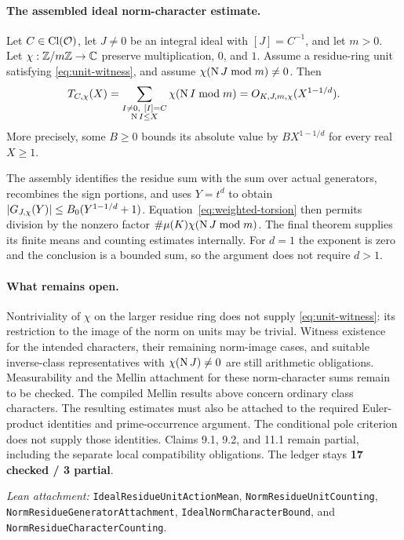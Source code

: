 \paragraph{The assembled ideal norm-character estimate.}
\begin{proposition}\label{prop:norm-character}
Let $C\in\operatorname{Cl}(\mathcal O)$, let $J\ne0$ be an integral ideal with $[J]=C^{-1}$,
and let $m>0$. Let $\chi:\mathbb Z/m\mathbb Z\to\mathbb C$ preserve multiplication,
$0$, and $1$. Assume a residue-ring unit satisfying
\eqref{eq:unit-witness}, and assume
$\chi(\operatorname N J\bmod m)\ne0$. Then
\[
 T_{C,\chi}(X)
 =\sum_{\substack{I\ne0,\ [I]=C\\\operatorname N I\leq X}}
       \chi(\operatorname N I\bmod m)
 =O_{K,J,m,\chi}(X^{1-1/d}).
\]
More precisely, some $B\geq0$ bounds its absolute value by
$BX^{1-1/d}$ for every real $X\geq1$.
\end{proposition}

The assembly identifies the residue sum with the sum over actual generators,
recombines the sign portions, and uses $Y=t^d$ to obtain
$\lvert G_{J,\chi}(Y)\rvert\leq B_0(Y^{1-1/d}+1)$.
Equation~\eqref{eq:weighted-torsion} then permits division by the nonzero
factor $\#\mu(K)\chi(\operatorname N J\bmod m)$.
The final theorem supplies its finite means and counting estimates internally.
For $d=1$ the exponent is zero and the conclusion is a bounded sum, so the
argument does not require $d>1$.

\paragraph{What remains open.}
Nontriviality of $\chi$ on the larger residue ring does not supply
\eqref{eq:unit-witness}: its restriction to the image of the norm on units
may be trivial. Witness existence for the intended characters, their
remaining norm-image cases, and suitable inverse-class representatives with
$\chi(\operatorname N J)\ne0$ are still arithmetic obligations.
Measurability and the Mellin attachment for these norm-character sums remain
to be checked. The compiled Mellin results above concern ordinary class characters.
The resulting estimates must also be attached to the required Euler-product
identities and prime-occurrence argument. The conditional pole criterion
does not supply those identities. Claims 9.1, 9.2, and 11.1 remain partial,
including the separate local compatibility obligations. The ledger stays
\textbf{17 checked / 3 partial}.

\smallskip
\noindent\emph{Lean attachment:}
\nolinkurl{IdealResidueUnitActionMean}, \nolinkurl{NormResidueUnitCounting},
\nolinkurl{NormResidueGeneratorAttachment}, \nolinkurl{IdealNormCharacterBound},
and \nolinkurl{NormResidueCharacterCounting}.
